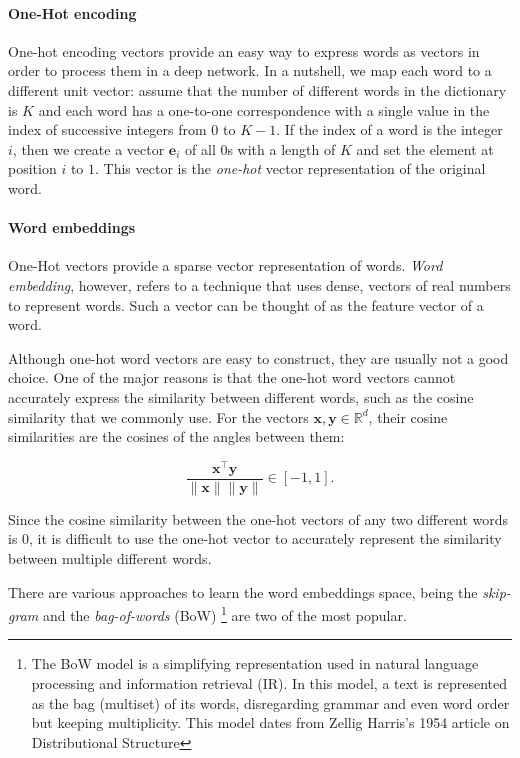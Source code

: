 \paragraph{One-Hot encoding}
One-hot encoding vectors provide an easy way to express words as vectors in order to process them in a deep network. In a nutshell, we map each word to a different unit vector: assume that the number of different words in the dictionary is $K$ and each word has a one-to-one correspondence with a single value in the index of successive integers from 0 to $K-1$. If the index of a word is the integer $i$, then we create a vector $\mathbf{e}_i$ of all 0s with a length of $K$ and set the element at position $i$ to $1$. This vector is the \textit{one-hot} vector representation of the original word. 

\paragraph{Word embeddings}\label{subsubsubsec:}

One-Hot vectors provide a sparse vector representation of words. \textit{Word embedding}, however, refers to a technique that uses dense, vectors of real numbers to represent words. Such a vector can be thought of as the feature vector of a word.  

Although one-hot word vectors are easy to construct, they are usually not a good choice. One of the major reasons is that the one-hot word vectors cannot accurately express the similarity between different words, such as the cosine similarity that we commonly use. For the vectors $\mathbf{x}, \mathbf{y} \in \mathbb{R}^d$, their cosine similarities are the cosines of the angles between them:

$$\frac{\mathbf{x}^\top \mathbf{y}}{\|\mathbf{x}\| \|\mathbf{y}\|} \in [-1, 1].$$

Since the cosine similarity between the one-hot vectors of any two different words is 0, it is difficult to use the one-hot vector to accurately represent the similarity between multiple different words.

There are various approaches to learn the word embeddings space, being the \textit{skip-gram}\citep{Mikolov2013} and the \textit{bag-of-words} (BoW) \footnote{The BoW model is a simplifying representation used in natural language processing and information retrieval (IR). In this model, a text is represented as the bag (multiset) of its words, disregarding grammar and even word order but keeping multiplicity. This model dates from Zellig Harris's 1954 article on Distributional Structure} are two of the most popular. 

